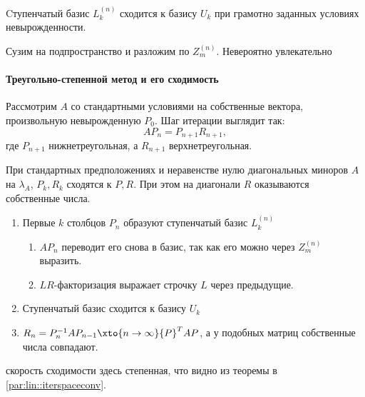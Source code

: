 \documentclass{trlnotes}
\begin{document}
\begin{thrm}\label{thrm:lin::iterspaceconv::stairbasis}
  Cтупенчатый базис $L_k^{(n)}$ сходится к базису $U_k$ при грамотно заданных
  условиях невырожденности.
\end{thrm}
\begin{prf}
  Сузим на подпространство и разложим по $Z_{m}^{(n)}$. Невероятно увлекательно
\end{prf}

\paragraph{Треугольно-степенной метод и его сходимость}
\label{par:lin::trpowermethod}

\begin{defn}\label{defn:lin::trpowermethod}
  Рассмотрим $A$ со стандартными условиями на собственные вектора, 
  произвольную невырожденную $P_0$.
  Шаг итерации выглядит так: 
  \[
    AP_{n} = P_{n+1}R_{n+1},
  \]где $P_{n+1}$ нижнетреугольная, а $R_{n+1}$ верхнетреугольная.
\end{defn}

\begin{thrm}\label{thrm:lin::trpowermethod::conv}
  При стандартных предположениях и неравенстве нулю диагональных
  миноров $A$ на $λ_A$, $P_k, R_k$ сходятся к $P, R$.
  При этом на диагонали $R$ оказываются собственные числа.
\end{thrm}

\begin{prf}
  \begin{enumerate}
    \item Первые $k$ столбцов $P_n$ образуют ступенчатый базис $L_k^{(n)}$
      \begin{enumerate}
        \item $AP_n$ переводит его снова в базис, так как его можно через $Z_{m}^{(n)}$
          выразить.
        \item $LR$-факторизация выражает строчку $L$ через предыдущие.
      \end{enumerate}
    \item Ступенчатый базис сходится к базису $U_k$
    \item $R_{n} = P_{n}^{-1}AP_{n-1} \xto{n\to\infty} {P}^T A P$, а у подобных матриц
      собственные числа совпадают.
  \end{enumerate}
\end{prf}
скорость сходимости здесь степенная, что видно из теоремы в
\ref{par:lin::iterspaceconv}.
\end{document}
